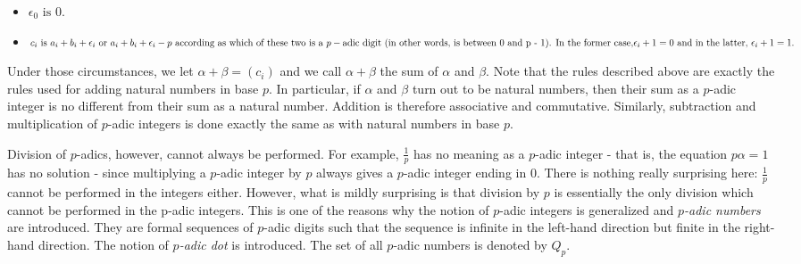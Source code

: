 \documentclass{llncs}
\begin{document}
\begin{itemize}
  \item  $\epsilon _0 \mbox{ is } 0.$\\
  \item  $c_i \mbox{ is } a_i + b_i + \epsilon _i \mbox{ or } a_i + b_i + \epsilon _i - p \mbox{ according as which of these two is a }\\
p-\mbox{adic digit (in other words, is between 0 and p - 1). In the former case,}\\
\epsilon _i+1 = 0 \mbox{ and in the latter, } \epsilon _i+1 = 1.$
\end{itemize}


Under those circumstances, we let $\alpha + \beta = (c_i)$ and we call $\alpha + \beta $ the sum of $\alpha $ and $\beta $. Note that the rules described above are exactly the rules used for adding natural numbers in base $p$. In particular, if $\alpha $ and $\beta $ turn out to be natural numbers, then their sum as a $p$-adic integer is no different from their sum as a natural number. Addition is therefore associative and commutative.
Similarly, subtraction and multiplication of $p$-adic integers is done exactly the same as with natural numbers in base $p$.

Division of $p$-adics, however, cannot always be performed. For example, $\frac{1}{p}$ has no meaning as a $p$-adic integer - that is, the equation $p\alpha  = 1$  has no solution - since multiplying a $p$-adic integer by $p$ always gives a $p$-adic integer ending in $0$. There is nothing really surprising here: $\frac{1}{p}$ cannot be performed in the integers either.
However, what is mildly surprising is that division by $p$ is essentially the only division which cannot be performed in the p-adic integers.  This is one of the reasons why the notion of
$p$-adic integers is generalized and {\em $p$-adic numbers} are introduced. They are formal sequences of $p$-adic digits such that the sequence is infinite in the left-hand direction but finite in the right-hand direction. The notion of {\em $p$-adic dot} is introduced. The set of all $p$-adic numbers is denoted by 
$Q_p$.
\end{document}
